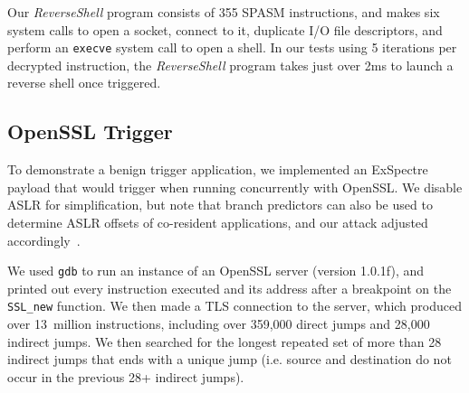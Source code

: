

Our \textit{ReverseShell} program consists of 355 SPASM instructions, and makes
six system calls to open a socket, connect to it, duplicate I/O file
descriptors, and perform an \texttt{execve} system call to open a shell. In our
tests using 5 iterations per decrypted instruction, the \textit{ReverseShell}
program takes just over 2ms to launch a reverse shell once triggered.


\FigSpasmModel

\subsection{OpenSSL Trigger}
\label{subsec:openssl-impl}


To demonstrate a benign trigger application, we implemented an ExSpectre payload
that would trigger when running concurrently with OpenSSL.
We disable ASLR for simplification, but note that branch predictors can also be
used to determine ASLR offsets of co-resident applications, and our attack
adjusted accordingly~\cite{evtyushkin2016jump}.

We used \texttt{gdb} to run an instance of an OpenSSL server (version 1.0.1f),
and printed out every instruction executed and its address after a breakpoint on
the \texttt{SSL\_new} function. We then made a TLS connection to the server,
which produced over 13~million instructions, including over 359,000 direct jumps
and 28,000 indirect jumps. We then searched for the longest repeated set of more
than 28 indirect jumps that ends with a unique jump (i.e. source and destination
do not occur in the previous 28+ indirect jumps).

